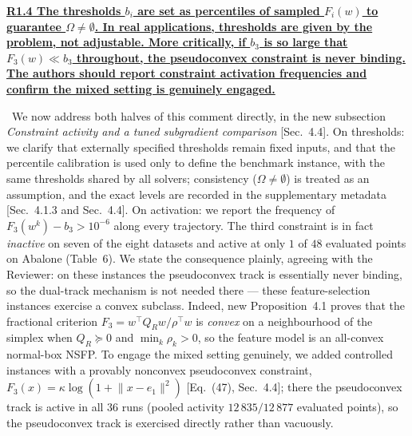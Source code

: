 \documentclass[11pt]{article}
\newcommand{\response}[1]{\smallskip\noindent{\color{blue!60!black}\textbf{Response.}}\ #1\par\medskip}
\newcommand{\loc}[1]{\textcolor{blue!50!black}{[#1]}}
\newenvironment{point}[1]{\medskip\noindent\textbf{\uline{#1}}\par}{\par}
\begin{document}
\begin{point}{R1.4 The thresholds $b_i$ are set as percentiles of sampled $F_i(w)$ to
guarantee $\Omega\neq\emptyset$. In real applications, thresholds are given by the problem,
not adjustable. More critically, if $b_3$ is so large that $F_3(w)\ll b_3$ throughout, the
pseudoconvex constraint is never binding. The authors should report constraint activation
frequencies and confirm the mixed setting is genuinely engaged.}
\response{We now address both halves of this comment directly, in the new subsection
\emph{Constraint activity and a tuned subgradient comparison} \loc{Sec.~4.4}. On
thresholds: we clarify that externally specified thresholds remain fixed inputs, and that
the percentile calibration is used only to define the benchmark instance, with the same
thresholds shared by all solvers; consistency ($\Omega\neq\emptyset$) is treated as an
assumption, and the exact levels are recorded in the supplementary metadata
\loc{Sec.~4.1.3 and Sec.~4.4}. On activation: we report the frequency of
$F_3(w^k)-b_3>10^{-6}$ along every trajectory. The third constraint is in fact
\emph{inactive} on seven of the eight datasets and active at only $1$ of $48$ evaluated
points on Abalone (Table~6). We state the consequence plainly, agreeing with the
Reviewer: on these instances the pseudoconvex track is essentially never binding, so the
dual-track mechanism is not needed there --- these feature-selection instances exercise a
convex subclass. Indeed, new Proposition~4.1 proves that the
fractional criterion $F_3=w^{\top}Q_Rw/\rho^{\top}w$ is \emph{convex} on a neighbourhood
of the simplex when $Q_R\succeq0$ and $\min_k\rho_k>0$, so the feature model is an
all-convex normal-box NSFP. To engage the mixed setting genuinely, we added controlled
instances with a provably nonconvex pseudoconvex constraint,
$F_3(x)=\kappa\log(1+\lVert x-e_1\rVert^2)$ \loc{Eq.~(47), Sec.~4.4}; there the
pseudoconvex track is active in all $36$ runs (pooled activity $12\,835/12\,877$ evaluated
points), so the pseudoconvex track is exercised directly rather than vacuously.}
\end{point}
\end{document}
